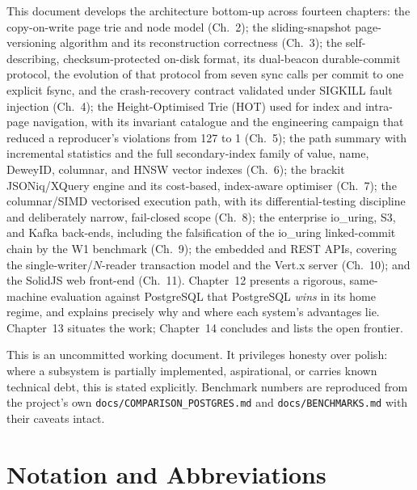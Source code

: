 \documentclass[11pt,a4paper,oneside]{report}
\theoremstyle{sirixthm}
\newcommand{\code}[1]{\texttt{#1}}
\begin{document}
This document develops the architecture bottom-up across fourteen chapters: the
copy-on-write page trie and node model (Ch.~2); the sliding-snapshot page-versioning
algorithm and its reconstruction correctness (Ch.~3); the self-describing,
checksum-protected on-disk format, its dual-beacon durable-commit protocol, the
evolution of that protocol from seven sync calls per commit to one explicit fsync,
and the crash-recovery contract validated under SIGKILL fault injection (Ch.~4); the
Height-Optimised Trie (HOT) used for index and intra-page navigation, with its
invariant catalogue and the engineering campaign that reduced a reproducer's
violations from 127 to 1 (Ch.~5); the path summary with incremental statistics and
the full secondary-index family of value, name, DeweyID, columnar, and HNSW vector indexes
(Ch.~6); the brackit JSONiq/XQuery engine and its
cost-based, index-aware optimiser (Ch.~7); the columnar/SIMD vectorised execution
path, with its differential-testing discipline and deliberately narrow, fail-closed scope (Ch.~8);
the enterprise io\_uring, S3, and Kafka back-ends, including the falsification of the
io\_uring linked-commit chain by the W1 benchmark (Ch.~9); the embedded and REST APIs, covering the single-writer/$N$-reader transaction model and the Vert.x server (Ch.~10);
and the SolidJS web front-end (Ch.~11). Chapter~12 presents a rigorous, same-machine evaluation
against
PostgreSQL that PostgreSQL \emph{wins} in its home regime, and explains precisely why
and where each system's advantages lie. Chapter~13 situates the work; Chapter~14
concludes and lists the open frontier.

\vspace{0.4cm}
\begin{honesty}
\small This is an uncommitted working document. It privileges honesty over polish:
where a subsystem is partially implemented, aspirational, or carries known technical
debt, this is stated explicitly. Benchmark numbers are reproduced from the project's
own \code{docs/COMPARISON\_POSTGRES.md} and \code{docs/BENCHMARKS.md} with their
caveats intact.
\end{honesty}

\tableofcontents
{}
\cleardoublepage

\chapter*{Notation and Abbreviations}
\end{document}
